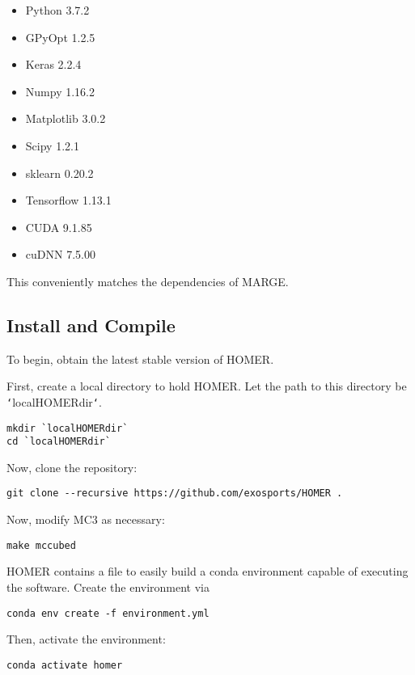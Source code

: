 \documentclass[letterpaper, 12pt]{article}
\begin{document}
\begin{itemize}
\item Python 3.7.2
\item GPyOpt 1.2.5
\item Keras 2.2.4
\item Numpy 1.16.2
\item Matplotlib 3.0.2
\item Scipy 1.2.1
\item sklearn 0.20.2
\item Tensorflow 1.13.1
\item CUDA 9.1.85
\item cuDNN 7.5.00
\end{itemize}

This conveniently matches the dependencies of MARGE.



\subsection{Install and Compile}
\label{sec:install}

\noindent To begin, obtain the latest stable version of HOMER.  

\noindent First, create a local directory to hold HOMER.  Let the path to this 
directory be \texttt{`}localHOMERdir\texttt{`}.

\begin{verbatim}
mkdir `localHOMERdir`
cd `localHOMERdir`
\end{verbatim}

\noindent Now, clone the repository:
\begin{verbatim}
git clone --recursive https://github.com/exosports/HOMER .
\end{verbatim}

\noindent Now, modify MC3 as necessary:

\begin{verbatim}
make mccubed
\end{verbatim}

\noindent HOMER contains a file to easily build a conda environment capable of 
executing the software.  Create the environment via

\begin{verbatim}
conda env create -f environment.yml
\end{verbatim}

\noindent Then, activate the environment:

\begin{verbatim}
conda activate homer
\end{verbatim}
\end{document}

